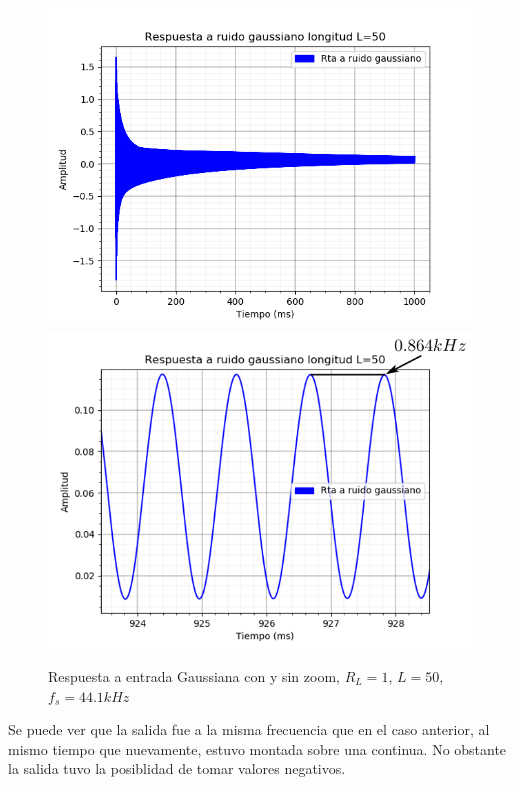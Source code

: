 \documentclass[assd_tp2_main.tex]{subfiles}
\begin{document}
\begin{figure}[H]
	\includegraphics[scale=0.55]{graficos/gaussBloqueS1.png}
	\includegraphics[scale=0.41]{graficos/gaussBloqueS1zoom.png}
	\caption{Respuesta a entrada Gaussiana con y sin zoom, $R_L=1$, $L=50$, $f_s=44.1kHz$}
\end{figure}

Se puede ver que la salida fue a la misma frecuencia que en el caso anterior, al mismo tiempo que nuevamente, estuvo montada sobre una continua. No obstante la salida tuvo la posiblidad de tomar valores negativos.
\end{document}
